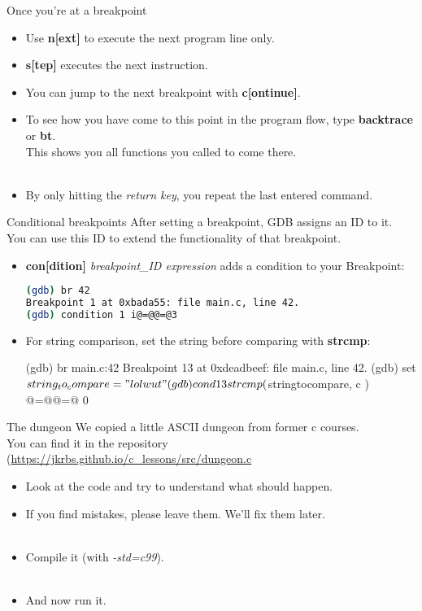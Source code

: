 \documentclass[10pt,graphics,aspectratio=169,table]{beamer}
\begin{document}
\begin{frame}{Once you're at a breakpoint}
	\begin{itemize}
		\item Use \textbf{n[ext]} to execute the next program line only.
		\item \textbf{s[tep]} executes the next instruction.
		\item You can jump to the next breakpoint with \textbf{c[ontinue]}.
		\item To see how you have come to this point in the program flow, type \textbf{backtrace} or \textbf{bt}.\\
		This shows you all functions you called to come there.
		\\\ \\
		\item By only hitting the \textit{return key}, you repeat the last entered  command.
	\end{itemize}
	
\end{frame}
\begin{frame}[fragile]{Conditional breakpoints}
After setting a breakpoint, GDB assigns an ID to it.\\
You can use this ID to extend the functionality of that breakpoint.
	\begin{itemize}
		\item \textbf{con[dition]} \textit{breakpoint\_ID expression} adds a condition to your Breakpoint:
		\begin{lstlisting}[numbers=none,language=bash]
(gdb) br 42
Breakpoint 1 at 0xbada55: file main.c, line 42.
(gdb) condition 1 i@=@@=@3
\end{lstlisting}
		\item For string comparison, set the string before comparing with \textbf{strcmp}:
		\begin{code}
(gdb) br main.c:42
Breakpoint 13 at 0xdeadbeef: file main.c, line 42.
(gdb) set $string_to_compare = "lolwut"
(gdb) cond 13 strcmp ( $stringtocompare, c ) @=@@=@ 0
\end{code}
	\end{itemize}
\end{frame}
\begin{frame}{The dungeon}
	We copied a little ASCII dungeon from former c courses.\\
	You can find it in the repository (\url{https://jkrbs.github.io/c_lessons/src/dungeon.c}\\
	\begin{itemize}
		\item Look at the code and try to understand what should happen.
		\item If you find mistakes, please leave them. We'll fix them later.
		\\\ 
		\item Compile it (with \textit{-std=c99}).
		\\\ 
		\item And now run it.
	\end{itemize}
\end{frame}
\end{document}
